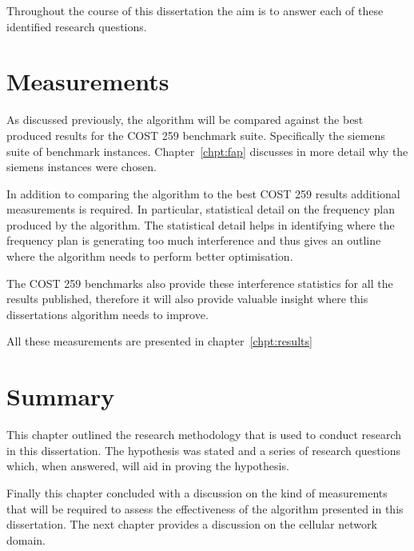 Throughout the course of this dissertation the aim is to answer each of these identified research questions. 

\section{Measurements}
As discussed previously, the algorithm will be compared against the best produced results for the \gls{COST} 259 benchmark suite. Specifically the siemens suite of benchmark instances. Chapter~\ref{chpt:fap} discusses in more detail why the siemens instances were chosen.

In addition to comparing the algorithm to the best \gls{COST} 259 results additional measurements is required. In particular, statistical detail on the frequency plan produced by the algorithm. The statistical detail helps in identifying where the frequency plan is generating too much interference and thus gives an outline where the algorithm needs to perform better optimisation.

The \gls{COST} 259 benchmarks also provide these interference statistics for all the results published, therefore it will also provide valuable insight where this dissertations algorithm needs to improve.

All these measurements are presented in chapter~\ref{chpt:results}
\section{Summary}
This chapter outlined the research methodology that is used to conduct research in this dissertation. The hypothesis was stated and a series of research questions which, when answered, will aid in proving the hypothesis.

Finally this chapter concluded with a discussion on the kind of measurements that will be required to assess the effectiveness of the algorithm presented in this dissertation. The next chapter provides a discussion on the cellular network domain.

